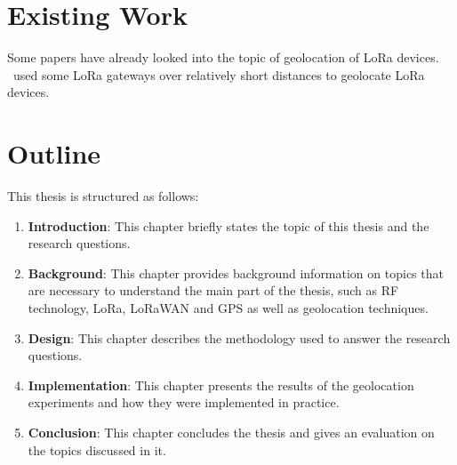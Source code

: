 \section{Existing Work}

Some papers have already looked into the topic of geolocation of \ac{LoRa} devices.
\cite{mackey_lora-based_2019}~used some \ac{LoRa} gateways over relatively short distances to geolocate \ac{LoRa} devices.

\section{Outline}

This thesis is structured as follows:

\begin{enumerate}
    \item \textbf{Introduction}:
          This chapter briefly states the topic of this thesis and the research questions.
    \item \textbf{Background}:
          This chapter provides background information on topics that are necessary to understand the main part of the thesis, such as \ac{RF} technology, \ac{LoRa}, \ac{LoRaWAN} and \ac{GPS} as well as geolocation techniques.
    \item \textbf{Design}:
          This chapter describes the methodology used to answer the research questions.
    \item \textbf{Implementation}:
          This chapter presents the results of the geolocation experiments and how they were implemented in practice.
    \item \textbf{Conclusion}:
          This chapter concludes the thesis and gives an evaluation on the topics discussed in it.
\end{enumerate}